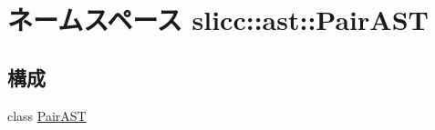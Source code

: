 \hypertarget{namespaceslicc_1_1ast_1_1PairAST}{
\section{ネームスペース slicc::ast::PairAST}
\label{namespaceslicc_1_1ast_1_1PairAST}
}
\subsection*{構成}
\begin{DoxyCompactItemize}
\item 
class \hyperlink{classslicc_1_1ast_1_1PairAST_1_1PairAST}{PairAST}
\end{DoxyCompactItemize}
